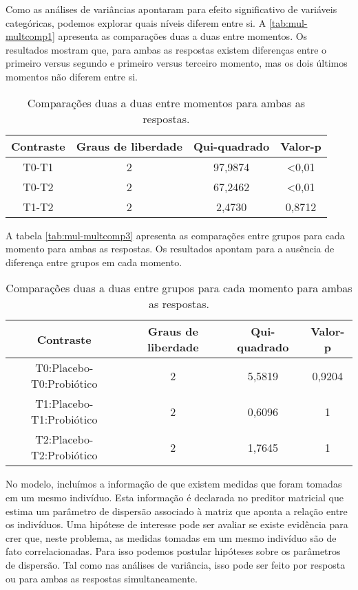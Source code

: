 Como as análises de variâncias apontaram para efeito significativo de variáveis categóricas, podemos explorar quais níveis diferem entre si. A \autoref{tab:mul-multcomp1} apresenta as comparações duas a duas entre momentos. Os resultados mostram que, para ambas as respostas existem diferenças entre o primeiro versus segundo e primeiro versus terceiro momento, mas os dois últimos momentos não diferem entre si.

\begin{table}[H]
\centering
\begin{tabular}{cccc}
\hline
Contraste & Graus de liberdade & Qui-quadrado & Valor-p        \\ \hline
T0-T1     & 2                  & 97,9874      & \textless 0,01 \\
T0-T2     & 2                  & 67,2462      & \textless 0,01 \\
T1-T2     & 2                  & 2,4730       & 0,8712         \\ \hline
\end{tabular}
\caption{Comparações duas a duas entre momentos para ambas as respostas.}
\label{tab:mul-multcomp1}
\end{table}

A tabela \autoref{tab:mul-multcomp3} apresenta as comparações entre grupos para cada momento para ambas as respostas. Os resultados apontam para a ausência de diferença entre grupos em cada momento.

\begin{table}[H]
\centering
\begin{tabular}{cccc}
\hline
Contraste                & Graus de liberdade & Qui-quadrado & Valor-p \\ \hline
T0:Placebo-T0:Probiótico & 2                  & 5,5819       & 0,9204  \\
T1:Placebo-T1:Probiótico & 2                  & 0,6096       & 1       \\
T2:Placebo-T2:Probiótico & 2                  & 1,7645       & 1       \\ \hline
\end{tabular}
\caption{Comparações duas a duas entre grupos para cada momento para ambas as respostas.}
\label{tab:mul-multcomp3}
\end{table}

No modelo, incluímos a informação de que existem medidas que foram tomadas em um mesmo indivíduo. Esta informação é declarada no preditor matricial que estima um parâmetro de dispersão associado à matriz que aponta a relação entre os indivíduos. Uma hipótese de interesse pode ser avaliar se existe evidência para crer que, neste problema, as medidas tomadas em um mesmo indivíduo são de fato correlacionadas. Para isso podemos postular hipóteses sobre os parâmetros de dispersão. Tal como nas análises de variância, isso pode ser feito por resposta ou para ambas as respostas simultaneamente.

